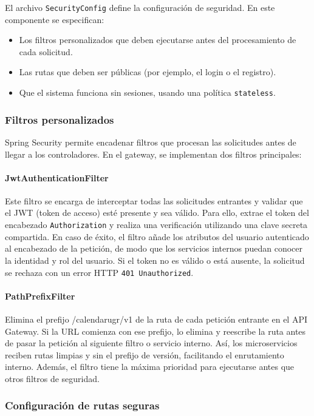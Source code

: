 El archivo \texttt{SecurityConfig} define la configuración de seguridad. En este componente se especifican:
\begin{itemize}
  \item Los filtros personalizados que deben ejecutarse antes del procesamiento de cada solicitud.
  \item Las rutas que deben ser públicas (por ejemplo, el login o el registro).
  \item Que el sistema funciona sin sesiones, usando una política \texttt{stateless}.
\end{itemize}

\subsubsection{Filtros personalizados}

Spring Security permite encadenar filtros que procesan las solicitudes antes de llegar a los controladores. En el gateway, se implementan dos filtros principales:

\paragraph{JwtAuthenticationFilter} Este filtro se encarga de interceptar todas las solicitudes entrantes y validar que el JWT (token de acceso) esté presente y sea válido. Para ello, extrae el token del encabezado \texttt{Authorization} y realiza una verificación utilizando una clave secreta compartida. En caso de éxito, el filtro añade los atributos del usuario autenticado al encabezado de la petición, de modo que los servicios internos puedan conocer la identidad y rol del usuario. Si el token no es válido o está ausente, la solicitud se rechaza con un error HTTP \texttt{401 Unauthorized}.

\paragraph{PathPrefixFilter} Elimina el prefijo /calendarugr/v1 de la ruta de cada petición entrante en el API Gateway. Si la URL comienza con ese prefijo, lo elimina y reescribe la ruta antes de pasar la petición al siguiente filtro o servicio interno. Así, los microservicios reciben rutas limpias y sin el prefijo de versión, facilitando el enrutamiento interno. Además, el filtro tiene la máxima prioridad para ejecutarse antes que otros filtros de seguridad.

\subsubsection{Configuración de rutas seguras}

